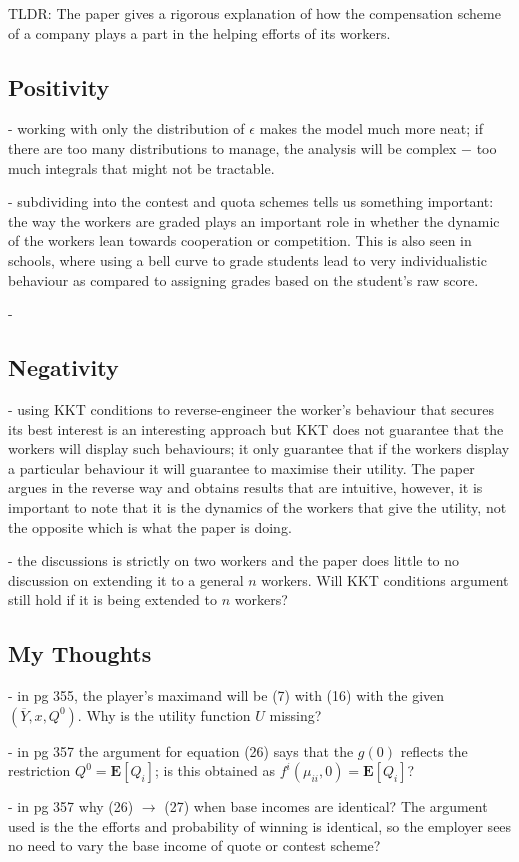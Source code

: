 \documentclass[a4paper,10pt,leqno]{article}
\theoremstyle{definition}
\begin{document}
TLDR: The paper gives a rigorous explanation of how the compensation scheme of a company plays a part in the helping efforts of its workers. 
 


\subsection*{Positivity}
- working with only the distribution of $\epsilon$ makes the model much more neat; if there are too many distributions to manage, the analysis will be complex $-$ too much integrals that might not be tractable.


- subdividing into the contest and quota schemes tells us something important: the way the workers are graded plays an important role in whether the dynamic of the workers lean towards cooperation or competition. This is also seen in schools, where using a bell curve to grade students lead to very individualistic behaviour as compared to assigning grades based on the student's raw score.

- 



\subsection*{Negativity}

-  using KKT conditions to reverse-engineer the worker's behaviour that secures its best interest is an interesting approach but KKT does not guarantee that the workers will display such behaviours; it only guarantee that if the workers display a particular behaviour it will guarantee to maximise their utility. The paper argues in the reverse way and obtains results that are intuitive, however, it is important to note that it is the dynamics of the workers that give the utility, not the opposite which is what the paper is doing.

- the discussions is strictly on two workers and the paper does little to no discussion on extending it to a general $n$ workers. Will KKT conditions argument still hold if it is being extended to $n$ workers?


\subsection*{\sffamily My Thoughts}
- in pg 355, the player's maximand will be (7) with (16) with the given $(\overline{Y},x,Q^0)$. Why is the utility function $U$ missing? 

- in pg 357 the argument for equation (26) says that the $g(0)$ reflects the restriction $Q^0=\mathbf{E}[Q_i]$; is this obtained as $f^i(\mu_{ii},0)=\mathbf{E}[Q_i]$?

- in pg 357 why (26) $\to$ (27) when base incomes are identical? The argument used is the the efforts and probability of winning is identical, so the employer sees no need to vary the base income of quote or contest scheme?

 

\end{document}
